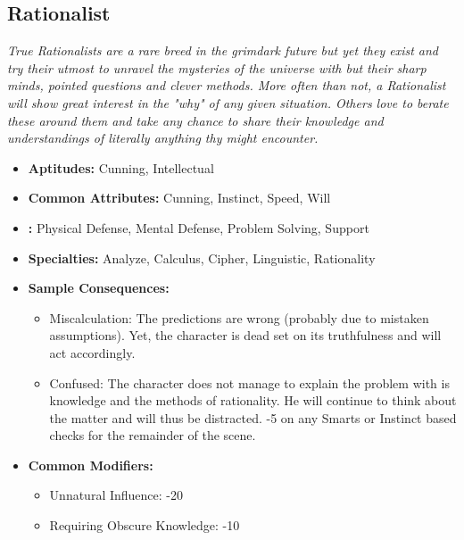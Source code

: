 	 \subsection{Rationalist}\label{Rationalist}
		 \textit{True Rationalists are a rare breed in the grimdark future but yet they exist and try their utmost to unravel the mysteries of the universe with but their sharp minds, pointed questions and clever methods.
		 More often than not, a Rationalist will show great interest in the "why" of any given situation.
		 Others love to berate these around them and take any chance to share their knowledge and understandings of literally anything thy might encounter.}
		 \begin{itemize}
		 	\item \textbf{Aptitudes:} Cunning, Intellectual
		 	\item \textbf{Common Attributes:} Cunning, Instinct, Speed, Will
		 	\item \textbf{:} Physical Defense, Mental Defense, Problem Solving, Support
		 	\item \textbf{Specialties:} Analyze, Calculus, Cipher, Linguistic, Rationality
		 	\item \textbf{Sample Consequences:} 
		 	\begin{itemize}
		 		\item Miscalculation: The predictions are wrong (probably due to mistaken assumptions). Yet, the character is dead set on its truthfulness and will act accordingly.
		 		\item Confused: The character does not manage to explain the problem with is knowledge and the methods of rationality. He will continue to think about the matter and will thus be distracted. -5 on any Smarts or Instinct based checks for the remainder of the scene.
		 	\end{itemize}
		 	\item \textbf{Common Modifiers:}
		 	\begin{itemize}
		 		\item Unnatural Influence: -20
		 		\item Requiring Obscure Knowledge: -10
		 	\end{itemize}
		 \end{itemize}

